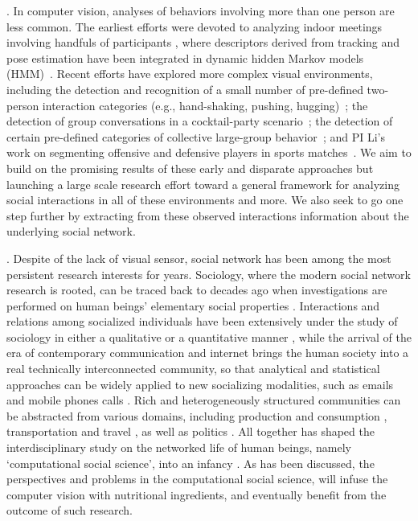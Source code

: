 . In computer vision, analyses of behaviors involving more than one person are less common. The earliest efforts were devoted to analyzing indoor meetings involving handfuls of participants \cite{GaticaPerez,McCowan:meeting}, where descriptors derived from tracking \cite{Smith:track} and pose estimation \cite{Ba:meeting} have been integrated in dynamic hidden Markov models (HMM)~\cite{Zhang:meeting}. Recent efforts have explored more complex visual environments, including the detection and recognition of a small number of pre-defined two-person interaction categories (e.g., hand-shaking, pushing, hugging)~\cite{UTdata}; the detection of group conversations in a cocktail-party scenario~\cite{Cristani:fformation}; the detection of certain pre-defined categories of collective large-group behavior~\cite{Choi:context,Choi:recogtrack,Amer:group,Lan:Group}; and PI Li's work on segmenting offensive and defensive players in sports matches~\cite{LiIJCV2012}. We aim to build on the promising results of these early and disparate approaches but launching a large scale research effort toward a general framework for analyzing social interactions in all of these environments and more. We also seek to go one step further by extracting from these observed interactions information about the underlying social network.

.  Despite of the lack of visual sensor, social network has been among the most persistent research interests for years. Sociology, where the modern social network research is rooted, can be traced back to decades ago when investigations are performed on human beings' elementary social properties \cite{Darwin,Thomkins,Goffman,Kendon1990,Ekman,Hoyle,Tannen}. Interactions and relations among socialized individuals have been extensively under the study of sociology in either a qualitative or a quantitative manner \cite{Goodwin2000,Goldin,Goodwin2007,Kendon2010}, while the arrival of the era of contemporary communication and internet brings the human society into a real technically interconnected community, so that analytical and statistical approaches can be widely applied to new socializing modalities, such as emails \cite{Eckmann} and mobile phones calls \cite{Onnela,Eagle}. Rich and heterogeneously structured communities can be abstracted from various domains, including production and consumption \cite{Watts}, transportation and travel \cite{Gonzalez},  as well as politics \cite{Iacus}. All together has shaped the interdisciplinary study on the networked life of human beings, namely `computational social science', into an infancy \cite{Lazer2009}. As has been discussed, the perspectives and problems in the computational social science, will infuse the computer vision with nutritional ingredients, and eventually benefit from the outcome of such research.

